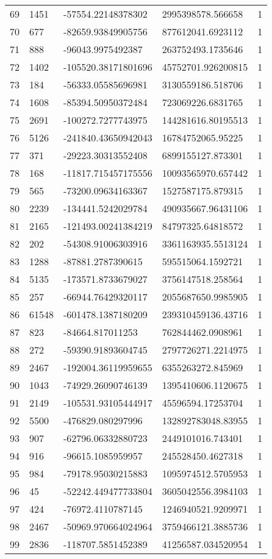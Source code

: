 \begin{longtable}{lllll}
    69 & 1451 & -57554.22148378302 & 2995398578.566658 & 1 \\
    70 & 677 & -82659.93849905756 & 877612041.6923112 & 1 \\
    71 & 888 & -96043.9975492387 & 263752493.1735646 & 1 \\
    72 & 1402 & -105520.38171801696 & 45752701.926200815 & 1 \\
    73 & 184 & -56333.05585696981 & 3130559186.518706 & 1 \\
    74 & 1608 & -85394.50950372484 & 723069226.6831765 & 1 \\
    75 & 2691 & -100272.7277743975 & 144281616.80195513 & 1 \\
    76 & 5126 & -241840.43650942043 & 16784752065.95225 & 1 \\
    77 & 371 & -29223.30313552408 & 6899155127.873301 & 1 \\
    78 & 168 & -11817.715457175556 & 10093565970.657442 & 1 \\
    79 & 565 & -73200.09634163367 & 1527587175.879315 & 1 \\
    80 & 2239 & -134441.5242029784 & 490935667.96431106 & 1 \\
    81 & 2165 & -121493.00241384219 & 84797325.64818572 & 1 \\
    82 & 202 & -54308.91006303916 & 3361163935.5513124 & 1 \\
    83 & 1288 & -87881.2787390615 & 595515064.1592721 & 1 \\
    84 & 5135 & -173571.8733679027 & 3756147518.258564 & 1 \\
    85 & 257 & -66944.76429320117 & 2055687650.9985905 & 1 \\
    86 & 61548 & -601478.1387180209 & 239310459136.43716 & 1 \\
    87 & 823 & -84664.817011253 & 762844462.0908961 & 1 \\
    88 & 272 & -59390.91893604745 & 2797726271.2214975 & 1 \\
    89 & 2467 & -192004.36119959655 & 6355263272.845969 & 1 \\
    90 & 1043 & -74929.26090746139 & 1395410606.1120675 & 1 \\
    91 & 2149 & -105531.93105444917 & 45596594.17253704 & 1 \\
    92 & 5500 & -476829.080297996 & 132892783048.83955 & 1 \\
    93 & 907 & -62796.06332880723 & 2449101016.743401 & 1 \\
    94 & 916 & -96615.1085959957 & 245528450.4627318 & 1 \\
    95 & 984 & -79178.95030215883 & 1095974512.5705953 & 1 \\
    96 & 45 & -52242.449477733804 & 3605042556.3984103 & 1 \\
    97 & 424 & -76972.4110787145 & 1246940521.9209971 & 1 \\
    98 & 2467 & -50969.970664024964 & 3759466121.3885736 & 1 \\
    99 & 2836 & -118707.5851452389 & 41256587.034520954 & 1
\end{longtable}